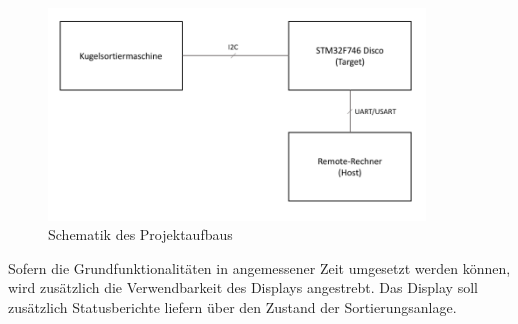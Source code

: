 \documentclass[12pt,a4paper]{article}
\begin{document}
\begin{figure}[h]
\begin{center}
\includegraphics[width=10cm]{grafiken/Schematik.png}
\caption{Schematik des Projektaufbaus}
\label{schematik_projektaufbau}
\end{center}
\end{figure}
Sofern die Grundfunktionalitäten in angemessener Zeit umgesetzt werden können, wird zusätzlich die Verwendbarkeit des Displays angestrebt. Das Display soll zusätzlich Statusberichte liefern über den Zustand der Sortierungsanlage. 
\end{document}
